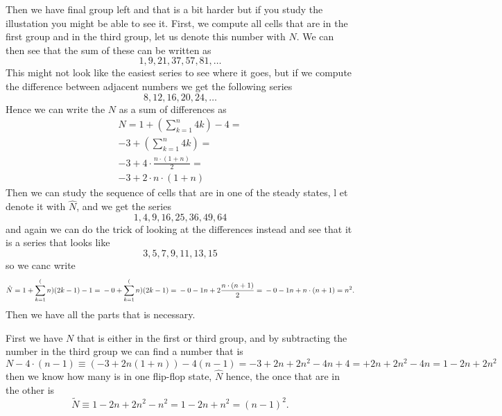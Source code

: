 \documentclass[]{article}
\begin{document}
Then we have final group left and that is a bit harder but if you study the illustation you might be able to see it. First, we compute all cells that are in the first group and in the third group, let us denote this number with $N$. We can then see that the sum of these can be written as 
\begin{equation}
    1,9,21,37,57,81,\ldots
\end{equation}
This might not look like the easiest series to see where it goes, but if we compute the difference between adjacent numbers we get the following series 
\begin{equation}
    8, 12, 16, 20, 24, \ldots
\end{equation}
Hence we can write the $N$ as a sum of differences as 
\begin{subequations}  
\begin{gather}
    N = 
    1 + \left(\sum_{k=1}^{n}4k\right) - 4 = \\
   -3 + \left(\sum_{k=1}^{n}4k\right)     = \\
   -3 + 4 \cdot \frac{n\cdot(1+n)}{2}     = \\
   -3 + 2 \cdot n\cdot(1+n)      
\end{gather}
\end{subequations} 
Then we can study the sequence of cells that are in one of the steady states, l et denote it with $\hat{N}$, and we get the series 
\begin{equation}
    1,4,9,16,25,36,49,64
\end{equation}
and again we can do the trick of looking at the differences instead and see that it is a series that looks like 
\begin{equation}
    3,5,7,9,11,13,15
\end{equation}
so we canc write 
\begin{equation}
    \hat{N} = 
     1 + \sum_{k=1}^(n) (2k-1) - 1 = \\
    -0 + \sum_{k=1}^(n) (2k-1)     = \\
    -0 - 1n + 2\frac{n\cdot(n+1)}{2} = \\
    -0 - 1n + n\cdot(n+1) = n^2.
\end{equation}
Then we have all the parts that is necessary. 

First we have $N$ that is either in the first or third group, and by subtracting the number in the third group we can find a number that is 
\begin{equation}
    N - 4\cdot(n-1) \equiv (-3 + 2n(1+n)) - 4(n-1) =
    -3 +2n + 2n^2 - 4n +4 = 
       +2n + 2n^2 - 4n    = 
    1  -2n + 2n^2
\end{equation}
then we know how many is in one flip-flop state, $\hat{N}$ hence, the once that are in the other is 
\begin{equation}
    \tilde{N} \equiv 
    1  -2n + 2n^2 - n^2 = 1 - 2n + n^2 = (n-1)^2.
\end{equation}
\end{document}
